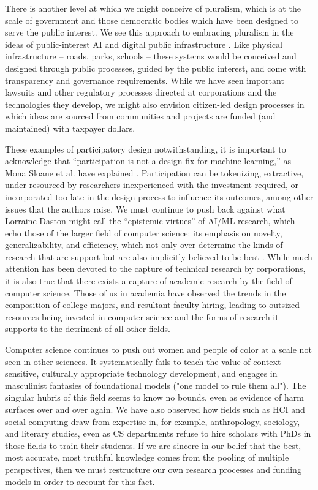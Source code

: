 There is another level at which we might conceive of pluralism, which is at the scale of government and those democratic bodies which have been designed to serve the public interest. We see this approach to embracing pluralism in the ideas of public-interest AI \cite{Broussard_2023} and digital public infrastructure \cite{What_Is_2020}. Like physical infrastructure – roads, parks, schools – these systems would be conceived and designed through public processes, guided by the public interest, and come with transparency and governance requirements. While we have seen important lawsuits and other regulatory processes directed at corporations and the technologies they develop, we might also envision citizen-led design processes in which ideas are sourced from communities and projects are funded (and maintained) with taxpayer dollars.


These examples of participatory design notwithstanding, it is important to acknowledge that “participation is not a design fix for machine learning,” as Mona Sloane et al. have explained \cite{Sloane_Moss_Awomolo_Forlano_2020}. Participation can be tokenizing, extractive, under-resourced by researchers inexperienced with the investment required, or incorporated too late in the design process to influence its outcomes, among other issues that the authors raise. We must continue to push back against what Lorraine Daston might call the “epistemic virtues” of AI/ML research, which echo those of the larger field of computer science: its emphasis on novelty, generalizability, and efficiency, which not only over-determine the kinds of research that are support but are also implicitly believed to be best \cite{daston_2014}. 
While much attention has been devoted to the capture of technical research by corporations, it is also true that there exists a capture of academic research by the field of computer science. Those of us in academia have observed the trends in the composition of college majors, and resultant faculty hiring, leading to outsized resources being invested in computer science and the forms of research it supports to the detriment of all other fields. 

Computer science continues to push out women and people of color at a scale not seen in other sciences. It systematically fails to teach the value of context-sensitive, culturally appropriate technology development, and engages in masculinist fantasies of foundational models ("one model to rule them all"). The singular hubris of this field seems to know no bounds, even as evidence of harm surfaces over and over again. We have also observed how fields such as HCI and social computing draw from expertise in, for example, anthropology, sociology, and literary studies, even as CS departments refuse to hire scholars with PhDs in those fields to train their students. 
If we are sincere in our belief that the best, most accurate, most truthful knowledge comes from the pooling of multiple perspectives, then we must restructure our own research processes and funding models in order to account for this fact.    

